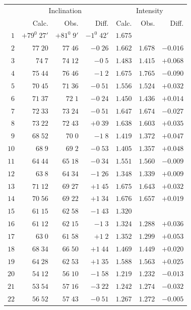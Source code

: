 \endgroup
\clearpage
{}
\begingroup
\fontsize{9}{10.2}\selectfont
\setlength{\tabcolsep}{1.5pt}
\renewcommand{\arraystretch}{1.02}
\begin{center}
\begin{tabular}{r||r|r|r||r|r|r}
\hline
&\multicolumn{3}{c||}{Inclination}&\multicolumn{3}{c}{Intensity}\\
&Calc.&Obs.&Diff.&Calc.&Obs.&Diff.\\\hline
$1$&$+79^0\;27'$&$+81^0\;9'$&$-1^0\;42'$&$1.675$&&\\
$2$&$77\;20$&$77\;46$&$-0\;26$&$1.662$&$1.678$&$-0.016$\\
$3$&$74\;7$&$74\;12$&$-0\;5$&$1.483$&$1.415$&$+0.068$\\
$4$&$75\;44$&$76\;46$&$-1\;2$&$1.675$&$1.765$&$-0.090$\\
$5$&$70\;45$&$71\;36$&$-0\;51$&$1.556$&$1.524$&$+0.032$\\
$6$&$71\;37$&$72\;1$&$-0\;24$&$1.450$&$1.436$&$+0.014$\\
$7$&$72\;33$&$73\;24$&$-0\;51$&$1.647$&$1.674$&$-0.027$\\
$8$&$73\;22$&$72\;43$&$+0\;39$&$1.638$&$1.603$&$+0.035$\\
$9$&$68\;52$&$70\;0$&$-1\;8$&$1.419$&$1.372$&$+0.047$\\
$10$&$68\;9$&$69\;2$&$-0\;53$&$1.405$&$1.357$&$+0.048$\\[2pt]
$11$&$64\;44$&$65\;18$&$-0\;34$&$1.551$&$1.560$&$-0.009$\\
$12$&$63\;8$&$64\;34$&$-1\;26$&$1.348$&$1.339$&$+0.009$\\
$13$&$71\;12$&$69\;27$&$+1\;45$&$1.675$&$1.643$&$+0.032$\\
$14$&$70\;56$&$69\;22$&$+1\;34$&$1.676$&$1.657$&$+0.019$\\
$15$&$61\;15$&$62\;58$&$-1\;43$&$1.320$&&\\
$16$&$61\;12$&$62\;15$&$-1\;3$&$1.324$&$1.288$&$+0.036$\\
$17$&$63\;0$&$61\;58$&$+1\;2$&$1.352$&$1.299$&$+0.053$\\
$18$&$68\;34$&$66\;50$&$+1\;44$&$1.469$&$1.449$&$+0.020$\\
$19$&$64\;28$&$62\;53$&$+1\;35$&$1.588$&$1.563$&$+0.025$\\
$20$&$54\;12$&$56\;10$&$-1\;58$&$1.219$&$1.232$&$-0.013$\\[2pt]
$21$&$53\;54$&$57\;16$&$-3\;22$&$1.242$&$1.274$&$-0.032$\\
$22$&$56\;52$&$57\;43$&$-0\;51$&$1.267$&$1.272$&$-0.005$\\

\end{tabular}
\end{center}
